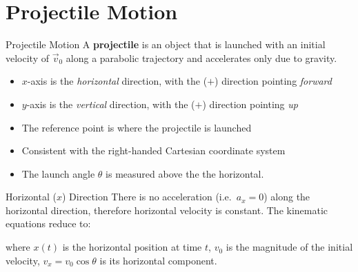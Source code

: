 \documentclass[12pt,compress,aspectratio=169,dvipsnames]{beamer}
\begin{document}
\section{Projectile Motion}

\begin{frame}{Projectile Motion}
  A \textbf{projectile} is an object that is launched with an initial velocity
  of $\vec v_0$ along a parabolic trajectory and accelerates only due to
  gravity.
  \begin{center}
  \end{center}
  \begin{itemize}
  \item $x$-axis is the \emph{horizontal} direction, with the ($+$) direction
    pointing \emph{forward}
  \item $y$-axis is the \emph{vertical} direction, with the ($+$) direction
    pointing \emph{up}
  \item The reference point is where the projectile is launched
  \item Consistent with the right-handed Cartesian coordinate system
  \item The launch angle $\theta$ is measured above the the horizontal.
  \end{itemize}
\end{frame}



\begin{frame}{Horizontal ($x$) Direction}
  There is no acceleration (i.e.\ $a_x=0$) along the horizontal direction,
  therefore horizontal velocity is constant. The kinematic equations reduce to:


  where $x(t)$ is the horizontal position at time $t$, $v_0$ is the
  magnitude of the initial velocity, $v_x=v_0\cos\theta$ is its horizontal
  component.
\end{frame}
\end{document}

